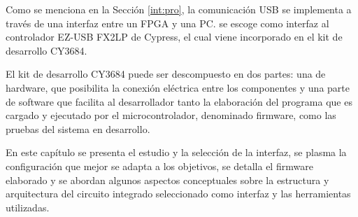 Como se menciona en la Sección \ref{int:pro}, la comunicación USB se implementa a través de una interfaz entre un FPGA y una PC. se escoge como interfaz al controlador EZ-USB FX2LP de Cypress, el cual viene incorporado en el kit de desarrollo CY3684.

El kit de desarrollo CY3684 puede ser descompuesto en dos partes: una de hardware, que posibilita la conexión eléctrica entre los componentes y una parte de software que facilita al desarrollador tanto la elaboración del programa que es cargado y ejecutado por el microcontrolador, denominado firmware, como las pruebas del sistema en desarrollo.

En este capítulo se presenta el estudio y la selección de la interfaz, se plasma la configuración que mejor se adapta a los objetivos, se detalla el firmware elaborado y se abordan algunos aspectos conceptuales sobre la estructura y arquitectura del circuito integrado seleccionado como interfaz y las herramientas utilizadas.%



